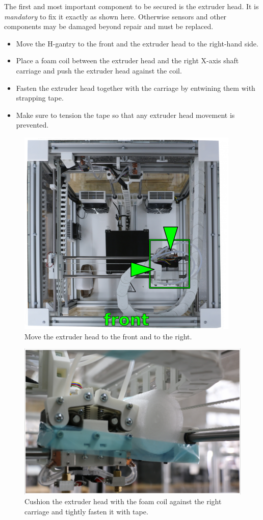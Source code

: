 The first and most important component to be secured is the extruder head. It is \emph{mandatory} to fix it exactly as shown here. Otherwise sensors and other components may be damaged beyond repair and must be replaced.

\begin{itemize}
  \item Move the H-gantry to the front and the extruder head to the right-hand side.
  \item Place a foam coil between the extruder head and the right X-axis shaft carriage and push the extruder head against the coil.
  \item Fasten the extruder head together with the carriage by entwining them with strapping tape.
  \item Make sure to tension the tape so that any extruder head movement is prevented.
\end{itemize}

 

\begin{figure}[H]
  \centering
  \includegraphics[width=.7\linewidth]{./img/packstep0.png}
  \caption{Move the extruder head to the front and to the right.}
\end{figure}

\begin{figure}[H]
  \centering
  \includegraphics[width=.7\linewidth]{./img/secure_extruderhead.png}
  \caption{Cushion the extruder head with the foam coil against the right carriage and tightly fasten it with tape.}
\end{figure}

